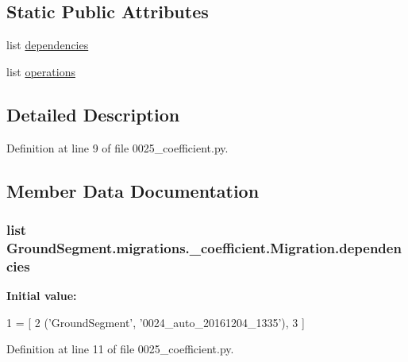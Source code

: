 \subsection*{Static Public Attributes}
\begin{DoxyCompactItemize}
\item 
list \hyperlink{class_ground_segment_1_1migrations_1_10025__coefficient_1_1_migration_a0fe2e11a6a8ed0749a1a3fa79ce7d214}{dependencies}
\item 
list \hyperlink{class_ground_segment_1_1migrations_1_10025__coefficient_1_1_migration_adc3ba9fae9d0b0167764a03d71bffe40}{operations}
\end{DoxyCompactItemize}


\subsection{Detailed Description}


Definition at line 9 of file 0025\+\_\+coefficient.\+py.



\subsection{Member Data Documentation}
\hypertarget{class_ground_segment_1_1migrations_1_10025__coefficient_1_1_migration_a0fe2e11a6a8ed0749a1a3fa79ce7d214}{}
\subsubsection[{dependencies}]{\setlength{\rightskip}{0pt plus 5cm}list Ground\+Segment.\+migrations.\+\_\+coefficient.\+Migration.\+dependencies\hspace{0.3cm}{\ttfamily [static]}}\label{class_ground_segment_1_1migrations_1_10025__coefficient_1_1_migration_a0fe2e11a6a8ed0749a1a3fa79ce7d214}
{\bfseries Initial value\+:}
\begin{DoxyCode}
1 = [
2         (\textcolor{stringliteral}{'GroundSegment'}, \textcolor{stringliteral}{'0024\_auto\_20161204\_1335'}),
3     ]
\end{DoxyCode}


Definition at line 11 of file 0025\+\_\+coefficient.\+py.

